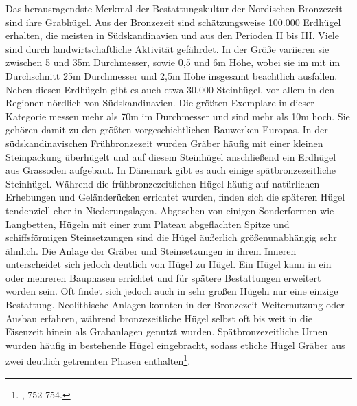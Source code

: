 \documentclass[openany,twoside,twocolumn]{book}
\let\rmarkdownfootnote\footnote%
\def\footnote{\protect\rmarkdownfootnote}
\begin{document}
Das herausragendste Merkmal der Bestattungskultur der Nordischen
Bronzezeit sind ihre Grabhügel. Aus der Bronzezeit sind schätzungsweise
100.000 Erdhügel erhalten, die meisten in Südskandinavien und aus den
Perioden II bis III. Viele sind durch landwirtschaftliche Aktivität
gefährdet. In der Größe variieren sie zwischen 5 und 35m Durchmesser,
sowie 0,5 und 6m Höhe, wobei sie im mit im Durchschnitt 25m Durchmesser
und 2,5m Höhe insgesamt beachtlich ausfallen. Neben diesen Erdhügeln
gibt es auch etwa 30.000 Steinhügel, vor allem in den Regionen nördlich
von Südskandinavien. Die größten Exemplare in dieser Kategorie messen
mehr als 70m im Durchmesser und sind mehr als 10m hoch. Sie gehören
damit zu den größten vorgeschichtlichen Bauwerken Europas. In der
südskandinavischen Frühbronzezeit wurden Gräber häufig mit einer kleinen
Steinpackung überhügelt und auf diesem Steinhügel anschließend ein
Erdhügel aus Grassoden aufgebaut. In Dänemark gibt es auch einige
spätbronzezeitliche Steinhügel. Während die frühbronzezeitlichen Hügel
häufig auf natürlichen Erhebungen und Geländerücken errichtet wurden,
finden sich die späteren Hügel tendenziell eher in Niederungslagen.
Abgesehen von einigen Sonderformen wie Langbetten, Hügeln mit einer zum
Plateau abgeflachten Spitze und schiffsförmigen Steinsetzungen sind die
Hügel äußerlich größenunabhängig sehr ähnlich. Die Anlage der Gräber und
Steinsetzungen in ihrem Inneren unterscheidet sich jedoch deutlich von
Hügel zu Hügel. Ein Hügel kann in ein oder mehreren Bauphasen errichtet
und für spätere Bestattungen erweitert worden sein. Oft findet sich
jedoch auch in sehr großen Hügeln nur eine einzige Bestattung.
Neolithische Anlagen konnten in der Bronzezeit Weiternutzung oder Ausbau
erfahren, während bronzezeitliche Hügel selbst oft bis weit in die
Eisenzeit hinein als Grabanlagen genutzt wurden. Spätbronzezeitliche
Urnen wurden häufig in bestehende Hügel eingebracht, sodass etliche
Hügel Gräber aus zwei deutlich getrennten Phasen enthalten\footnote{\textcite{thrane_scandinavia_2013},
  752-754.}.
\end{document}
